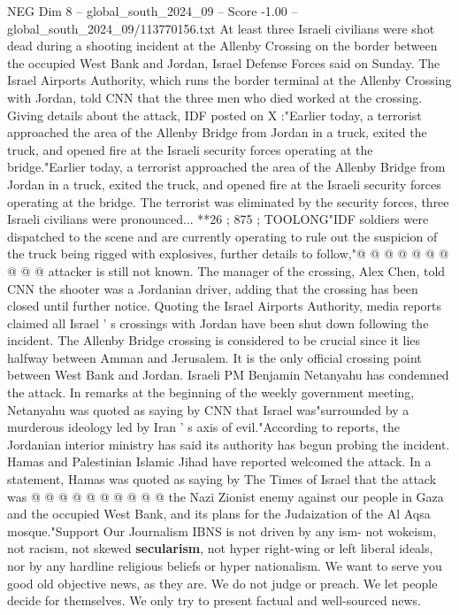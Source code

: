 \begin{textsample}{NEG Dim 8 – global\_south\_2024\_09 – Score -1.00 – global\_south\_2024\_09/113770156.txt}  \label{ex:f8_neg_206}
At least three Israeli civilians were shot dead during a shooting incident at the Allenby Crossing on the border between the occupied West Bank and Jordan, Israel Defense Forces said on Sunday.
The Israel Airports Authority, which runs the border terminal at the Allenby Crossing with Jordan, told CNN that the three men who died worked at the crossing.
Giving details about the attack, IDF posted on X :"Earlier today, a terrorist approached the area of the Allenby Bridge from Jordan in a truck, exited the truck, and opened fire at the Israeli security forces operating at the bridge."Earlier today, a terrorist approached the area of the Allenby Bridge from Jordan in a truck, exited the truck, and opened fire at the Israeli security forces operating at the bridge.
The terrorist was eliminated by the security forces, three Israeli civilians were pronounced... **26 ; 875 ; TOOLONG"IDF soldiers were dispatched to the scene and are currently operating to rule out the suspicion of the truck being rigged with explosives, further details to follow,"@ @ @ @ @ @ @ @ @ @ attacker is still not known.
The manager of the crossing, Alex Chen, told CNN the shooter was a Jordanian driver, adding that the crossing has been closed until further notice.
Quoting the Israel Airports Authority, media reports claimed all Israel ' s crossings with Jordan have been shut down following the incident.
The Allenby Bridge crossing is considered to be crucial since it lies halfway between Amman and Jerusalem.
It is the only official crossing point between West Bank and Jordan.
Israeli PM Benjamin Netanyahu has condemned the attack.
In remarks at the beginning of the weekly government meeting, Netanyahu was quoted as saying by CNN that Israel was"surrounded by a murderous ideology led by Iran ' s axis of evil."According to reports, the Jordanian interior ministry has said its authority has begun probing the incident.
Hamas and Palestinian Islamic Jihad have reported welcomed the attack.
In a statement, Hamas was quoted as saying by The Times of Israel that the attack was @ @ @ @ @ @ @ @ @ @ the Nazi Zionist enemy against our people in Gaza and the occupied West Bank, and its plans for the Judaization of the Al Aqsa mosque."Support Our Journalism IBNS is not driven by any ism- not wokeism, not racism, not skewed \textbf{secularism}, not hyper right-wing or left liberal ideals, nor by any hardline religious beliefs or hyper nationalism.
We want to serve you good old objective news, as they are.
We do not judge or preach.
We let people decide for themselves.
We only try to present factual and well-sourced news.

\end{textsample}
